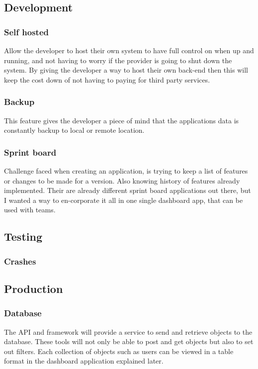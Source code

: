 \subsection{Development}

\subsubsection{Self hosted}
Allow the developer to host their own system to have full control on when up and running, and not having to worry if the provider is going to shut down the system. By giving the developer a way to host their own back-end then this will keep the cost down of not having to paying for third party services.

\subsubsection{Backup}
This feature gives the developer a piece of mind that the applications data is constantly backup to local or remote location.

\subsubsection{Sprint board}
Challenge faced when creating an application, is trying to keep a list of features or changes to be made for a version. Also knowing history of features already implemented. Their are already different sprint board applications out there, but I wanted a way to en-corporate it all in one single dashboard app, that can be used with teams.


\subsection{Testing}

\subsubsection{Crashes}

\subsection{Production}

\subsubsection{Database}
The API and framework will provide a service to send and retrieve objects to the  database. These tools will not only be able to post and get objects but also to set out filters. Each collection of objects such as users can be viewed in a table format in the dashboard application explained later.

